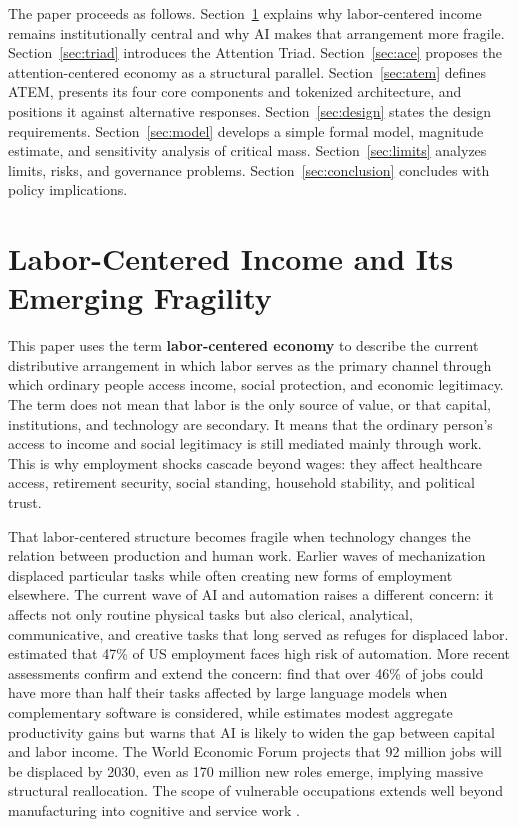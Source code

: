 \documentclass[12pt, a4paper]{article}
\begin{document}
The paper proceeds as follows. Section~\ref{sec:labor} explains why labor-centered income remains institutionally central and why AI makes that arrangement more fragile. Section~\ref{sec:triad} introduces the Attention Triad. Section~\ref{sec:ace} proposes the attention-centered economy as a structural parallel. Section~\ref{sec:atem} defines ATEM, presents its four core components and tokenized architecture, and positions it against alternative responses. Section~\ref{sec:design} states the design requirements. Section~\ref{sec:model} develops a simple formal model, magnitude estimate, and sensitivity analysis of critical mass. Section~\ref{sec:limits} analyzes limits, risks, and governance problems. Section~\ref{sec:conclusion} concludes with policy implications.


\section{Labor-Centered Income and Its Emerging Fragility}
\label{sec:labor}

This paper uses the term \textbf{labor-centered economy} to describe the current distributive arrangement in which labor serves as the primary channel through which ordinary people access income, social protection, and economic legitimacy. The term does not mean that labor is the only source of value, or that capital, institutions, and technology are secondary. It means that the ordinary person's access to income and social legitimacy is still mediated mainly through work. This is why employment shocks cascade beyond wages: they affect healthcare access, retirement security, social standing, household stability, and political trust.

That labor-centered structure becomes fragile when technology changes the relation between production and human work. Earlier waves of mechanization displaced particular tasks while often creating new forms of employment elsewhere. The current wave of AI and automation raises a different concern: it affects not only routine physical tasks but also clerical, analytical, communicative, and creative tasks that long served as refuges for displaced labor. \citet{frey2017} estimated that 47\% of US employment faces high risk of automation. More recent assessments confirm and extend the concern: \citet{eloundou2024} find that over 46\% of jobs could have more than half their tasks affected by large language models when complementary software is considered, while \citet{acemoglu2025} estimates modest aggregate productivity gains but warns that AI is likely to widen the gap between capital and labor income. The World Economic Forum \citeyearpar{wef2025} projects that 92 million jobs will be displaced by 2030, even as 170 million new roles emerge, implying massive structural reallocation. The scope of vulnerable occupations extends well beyond manufacturing into cognitive and service work \citep{brynjolfsson2014, ford2015}.
\end{document}
